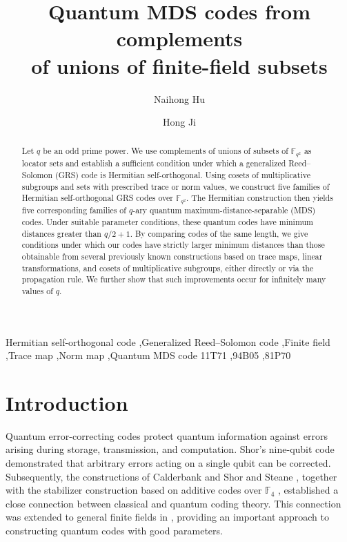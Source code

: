 \documentclass[preprint,12pt,a4paper]{elsarticle}
\begin{document}
\begin{frontmatter}

\title{Quantum MDS codes from complements\\of unions of finite-field subsets}

\author[aff1]{Naihong Hu}
\author[aff1]{Hong Ji}
\address[aff1]{School of Mathematical Sciences, MOE Key Laboratory of Mathematics and Engineering Applications $\&$ Shanghai Key Laboratory of PMMP, East China Normal University, Shanghai 200241, China}

\begin{abstract}
Let $q$ be an odd prime power. We use complements of unions of subsets of $\mathbb F_{q^2}$ as locator sets and establish a sufficient condition under which a generalized Reed--Solomon (GRS) code is Hermitian self-orthogonal. Using cosets of multiplicative subgroups and sets with prescribed trace or norm values, we construct five families of Hermitian self-orthogonal GRS codes over $\mathbb F_{q^2}$. The Hermitian construction then yields five corresponding families of $q$-ary quantum maximum-distance-separable (MDS) codes. Under suitable parameter conditions, these quantum codes have minimum distances greater than $q/2+1$. By comparing codes of the same length, we give conditions under which our codes have strictly larger minimum distances than those obtainable from several previously known constructions based on trace maps, linear transformations, and cosets of multiplicative subgroups, either directly or via the propagation rule. We further show that such improvements occur for infinitely many values of $q$.
\end{abstract}

\begin{keyword}
Hermitian self-orthogonal code \sep Generalized Reed--Solomon code \sep Finite field \sep Trace map \sep Norm map \sep Quantum MDS code
\MSC[2020] 11T71 \sep 94B05 \sep 81P70
\end{keyword}

\end{frontmatter}

\section{Introduction}\label{sec:introduction}

Quantum error-correcting codes protect quantum information against errors arising during storage, transmission, and computation. Shor's nine-qubit code \cite{Shor1995} demonstrated that arbitrary errors acting on a single qubit can be corrected. Subsequently, the constructions of Calderbank and Shor \cite{CalderbankShor1996} and Steane \cite{Steane1996}, together with the stabilizer construction based on additive codes over $\mathbb F_4$ \cite{CalderbankRainsShorSloane1998}, established a close connection between classical and quantum coding theory. This connection was extended to general finite fields in \cite{AshikhminKnill2001,KetkarEtAl2006}, providing an important approach to constructing quantum codes with good parameters.
\end{document}
